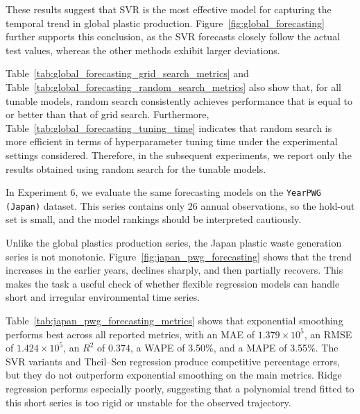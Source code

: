 These results suggest that SVR is the most effective model for capturing the temporal trend in global plastic production. Figure~\ref{fig:global_forecasting} further supports this conclusion, as the SVR forecasts closely follow the actual test values, whereas the other methods exhibit larger deviations.




Table~\ref{tab:global_forecasting_grid_search_metrics} and Table~\ref{tab:global_forecasting_random_search_metrics} also show that, for all tunable models, random search consistently achieves performance that is equal to or better than that of grid search. Furthermore, Table~\ref{tab:global_forecasting_tuning_time} indicates that random search is more efficient in terms of hyperparameter tuning time under the experimental settings considered. Therefore, in the subsequent experiments, we report only the results obtained using random search for the tunable models.


In Experiment 6, we evaluate the same forecasting models on the \texttt{YearPWG (Japan)} dataset. This series contains only 26 annual observations, so the hold-out set is small, and the model rankings should be interpreted cautiously.




Unlike the global plastics production series, the Japan plastic waste generation series is not monotonic. Figure~\ref{fig:japan_pwg_forecasting} shows that the trend increases in the earlier years, declines sharply, and then partially recovers. This makes the task a useful check of whether flexible regression models can handle short and irregular environmental time series.


Table~\ref{tab:japan_pwg_forecasting_metrics} shows that exponential smoothing performs best across all reported metrics, with an MAE of \(1.379 \times 10^5\), an RMSE of \(1.424 \times 10^5\), an \(R^2\) of 0.374, a WAPE of 3.50\%, and a MAPE of 3.55\%. The SVR variants and Theil--Sen regression produce competitive percentage errors, but they do not outperform exponential smoothing on the main metrics. Ridge regression performs especially poorly, suggesting that a polynomial trend fitted to this short series is too rigid or unstable for the observed trajectory.

